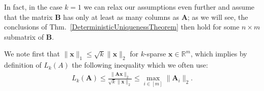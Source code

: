 \documentclass[9pt,twocolumn]{pnas-new}
\begin{document}
In fact, in the case $k=1$ we can relax our assumptions even further and assume that the matrix $\mathbf{B}$ has only at least as many columns as $\mathbf{A}$; as we will see, the conclusions of Thm.~\ref{DeterministicUniquenessTheorem} then hold for some $n \times m$ submatrix of $\mathbf{B}$.

We note first that $\|\mathbf{x}\|_1 \leq \sqrt{k} \|\mathbf{x}\|_2$ for $k$-sparse $\mathbf{x} \in \mathbb{R}^m$, which implies by definition of $L_k(A)$ the following inequality which we often use:
\begin{align}\label{delrho}
L_k(\mathbf{A}) \leq \frac{\|\mathbf{A}\mathbf{x}\|_2}{\sqrt{k} \|\mathbf{x}\|_2} %
\leq  \max_{i \in [m]}\|\mathbf{A}_i\|_2.
\end{align}
\end{document}

